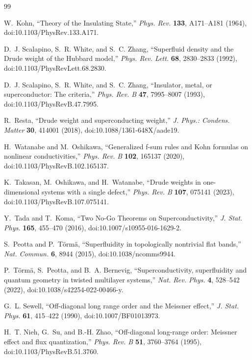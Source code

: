 \documentclass[11pt]{article}
\theoremstyle{definition}
\theoremstyle{remark}
\begin{document}
\begingroup\raggedright
\begin{thebibliography}{99}

W.~Kohn,
``Theory of the Insulating State,''
\emph{Phys. Rev.} \textbf{133}, A171--A181 (1964),
doi:10.1103/PhysRev.133.A171.

D.~J. Scalapino, S.~R. White, and S.~C. Zhang,
``Superfluid density and the Drude weight of the Hubbard model,''
\emph{Phys. Rev. Lett.} \textbf{68}, 2830--2833 (1992),
doi:10.1103/PhysRevLett.68.2830.

D.~J. Scalapino, S.~R. White, and S.~C. Zhang,
``Insulator, metal, or superconductor: The criteria,''
\emph{Phys. Rev. B} \textbf{47}, 7995--8007 (1993),
doi:10.1103/PhysRevB.47.7995.

R.~Resta,
``Drude weight and superconducting weight,''
\emph{J. Phys.: Condens. Matter} \textbf{30}, 414001 (2018),
doi:10.1088/1361-648X/aade19.

H.~Watanabe and M.~Oshikawa,
``Generalized f-sum rules and Kohn formulas on nonlinear conductivities,''
\emph{Phys. Rev. B} \textbf{102}, 165137 (2020),
doi:10.1103/PhysRevB.102.165137.

K.~Takasan, M.~Oshikawa, and H.~Watanabe,
``Drude weights in one-dimensional systems with a single defect,''
\emph{Phys. Rev. B} \textbf{107}, 075141 (2023),
doi:10.1103/PhysRevB.107.075141.

Y.~Tada and T.~Koma,
``Two No-Go Theorems on Superconductivity,''
\emph{J. Stat. Phys.} \textbf{165}, 455--470 (2016),
doi:10.1007/s10955-016-1629-2.

S.~Peotta and P.~T{\"o}rm{\"a},
``Superfluidity in topologically nontrivial flat bands,''
\emph{Nat. Commun.} \textbf{6}, 8944 (2015),
doi:10.1038/ncomms9944.

P.~T{\"o}rm{\"a}, S.~Peotta, and B.~A. Bernevig,
``Superconductivity, superfluidity and quantum geometry in twisted multilayer systems,''
\emph{Nat. Rev. Phys.} \textbf{4}, 528--542 (2022),
doi:10.1038/s42254-022-00466-y.

G.~L. Sewell,
``Off-diagonal long range order and the Meissner effect,''
\emph{J. Stat. Phys.} \textbf{61}, 415--422 (1990),
doi:10.1007/BF01013973.

H.~T. Nieh, G.~Su, and B.-H. Zhao,
``Off-diagonal long-range order: Meissner effect and flux quantization,''
\emph{Phys. Rev. B} \textbf{51}, 3760--3764 (1995),
doi:10.1103/PhysRevB.51.3760.


\end{thebibliography}
\end{document}

